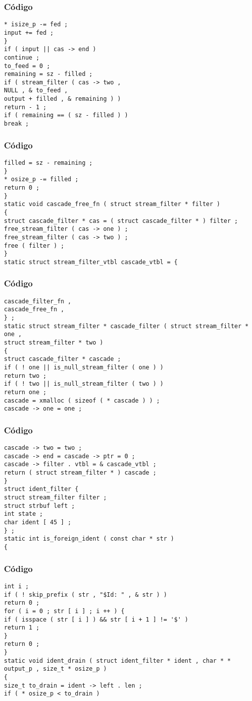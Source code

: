 \documentclass{beamer}
\begin{document}
\begin{frame}[fragile]
\frametitle{C\'odigo}
\begin{verbatim}
* isize_p -= fed ; 
input += fed ; 
} 
if ( input || cas -> end ) 
continue ; 
to_feed = 0 ; 
remaining = sz - filled ; 
if ( stream_filter ( cas -> two , 
NULL , & to_feed , 
output + filled , & remaining ) ) 
return - 1 ; 
if ( remaining == ( sz - filled ) ) 
break ; 
\end{verbatim}
\end{frame}
\begin{frame}[fragile]
\frametitle{C\'odigo}
\begin{verbatim}
filled = sz - remaining ; 
} 
* osize_p -= filled ; 
return 0 ; 
} 
static void cascade_free_fn ( struct stream_filter * filter ) 
{ 
struct cascade_filter * cas = ( struct cascade_filter * ) filter ; 
free_stream_filter ( cas -> one ) ; 
free_stream_filter ( cas -> two ) ; 
free ( filter ) ; 
} 
static struct stream_filter_vtbl cascade_vtbl = { 
\end{verbatim}
\end{frame}
\begin{frame}[fragile]
\frametitle{C\'odigo}
\begin{verbatim}
cascade_filter_fn , 
cascade_free_fn , 
} ; 
static struct stream_filter * cascade_filter ( struct stream_filter * one , 
struct stream_filter * two ) 
{ 
struct cascade_filter * cascade ; 
if ( ! one || is_null_stream_filter ( one ) ) 
return two ; 
if ( ! two || is_null_stream_filter ( two ) ) 
return one ; 
cascade = xmalloc ( sizeof ( * cascade ) ) ; 
cascade -> one = one ; 
\end{verbatim}
\end{frame}
\begin{frame}[fragile]
\frametitle{C\'odigo}
\begin{verbatim}
cascade -> two = two ; 
cascade -> end = cascade -> ptr = 0 ; 
cascade -> filter . vtbl = & cascade_vtbl ; 
return ( struct stream_filter * ) cascade ; 
} 
struct ident_filter { 
struct stream_filter filter ; 
struct strbuf left ; 
int state ; 
char ident [ 45 ] ; 
} ; 
static int is_foreign_ident ( const char * str ) 
{ 
\end{verbatim}
\end{frame}
\begin{frame}[fragile]
\frametitle{C\'odigo}
\begin{verbatim}
int i ; 
if ( ! skip_prefix ( str , "$Id: " , & str ) ) 
return 0 ; 
for ( i = 0 ; str [ i ] ; i ++ ) { 
if ( isspace ( str [ i ] ) && str [ i + 1 ] != '$' ) 
return 1 ; 
} 
return 0 ; 
} 
static void ident_drain ( struct ident_filter * ident , char * * output_p , size_t * osize_p ) 
{ 
size_t to_drain = ident -> left . len ; 
if ( * osize_p < to_drain ) 
\end{verbatim}
\end{frame}
\end{document}
